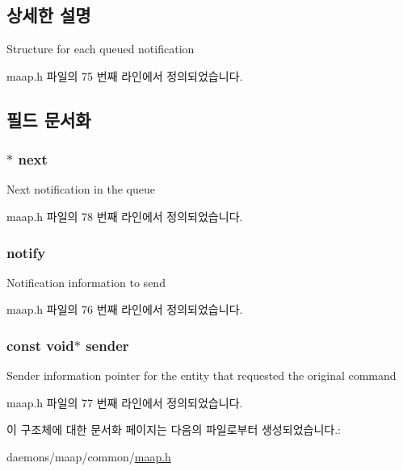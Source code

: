 \subsection{상세한 설명}
Structure for each queued notification 

maap.\+h 파일의 75 번째 라인에서 정의되었습니다.



\subsection{필드 문서화}
\subsubsection[{\texorpdfstring{next}{next}}]{$\ast$ next}\hypertarget{structmaap__notify__list_af599eaac27b6bff8faccf3831694bace}{}\label{structmaap__notify__list_af599eaac27b6bff8faccf3831694bace}
Next notification in the queue 

maap.\+h 파일의 78 번째 라인에서 정의되었습니다.

\subsubsection[{\texorpdfstring{notify}{notify}}]{ notify}\hypertarget{structmaap__notify__list_a1f432a44e5c304a860941b05468fa821}{}\label{structmaap__notify__list_a1f432a44e5c304a860941b05468fa821}
Notification information to send 

maap.\+h 파일의 76 번째 라인에서 정의되었습니다.

\subsubsection[{\texorpdfstring{sender}{sender}}]{\setlength{\rightskip}{0pt plus 5cm}const void$\ast$ sender}\hypertarget{structmaap__notify__list_a6da9953a2443ab3bd33eea3534c01fdd}{}\label{structmaap__notify__list_a6da9953a2443ab3bd33eea3534c01fdd}
Sender information pointer for the entity that requested the original command 

maap.\+h 파일의 77 번째 라인에서 정의되었습니다.



이 구조체에 대한 문서화 페이지는 다음의 파일로부터 생성되었습니다.\+:\begin{DoxyCompactItemize}
\item 
daemons/maap/common/\hyperlink{maap_8h}{maap.\+h}\end{DoxyCompactItemize}
